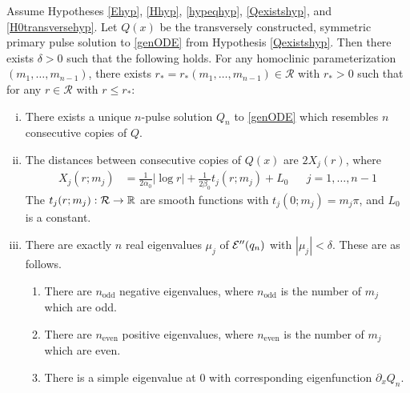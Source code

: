 \documentclass[thesis.tex]{subfiles}
\begin{document}
\begin{theorem}\label{multipulseexistR}
Assume Hypotheses \ref{Ehyp}, \ref{Hhyp}, \ref{hypeqhyp}, \ref{Qexistshyp}, and \ref{H0transversehyp}. Let $Q(x)$ be the transversely constructed, symmetric primary pulse solution to \eqref{genODE} from Hypothesis \ref{Qexistshyp}. Then there exists $\delta > 0$ such that the following holds. For any homoclinic parameterization $(m_1, \dots, m_{n-1})$, there exists $r_* = r_*(m_1, \dots, m_{n-1}) \in \mathcal{R}$ with $r_* > 0$ such that for any $r \in \mathcal{R}$ with $r \leq r_*$:
\begin{enumerate}[(i)]
\item There exists a unique $n$-pulse solution $Q_n$ to \cref{genODE} which resembles $n$ consecutive copies of $Q$. 
\item The distances between consecutive copies of $Q(x)$ are $2 X_j(r)$, where
\begin{align}\label{nhompeaks}
X_j(r; m_j) &= \frac{1}{2 \alpha_0} |\log r| + \frac{1}{2\beta_0} t_j(r; m_j) + L_0 && j = 1, \dots, n-1
\end{align}
The $t_j(r; m_j): \mathcal{R} \rightarrow \mathbb{R}$ are smooth functions with $t_j(0; m_j) = m_j \pi$, and $L_0$ is a constant.

\item There are exactly $n$ real eigenvalues $\mu_j$ of $\mathcal{E}''(q_n)$ with $|\mu_j| < \delta$. These are as follows.
\begin{enumerate}
	\item There are $n_{\text{odd}}$ negative eigenvalues, where $n_{\text{odd}}$ is the number of $m_j$ which are odd.
	\item There are $n_{\text{even}}$ positive eigenvalues, where $n_{\text{even}}$ is the number of $m_j$ which are even.
	\item There is a simple eigenvalue at 0 with corresponding eigenfunction $\partial_x Q_n$.
\end{enumerate}


\end{enumerate}
\end{theorem}
\end{document}
